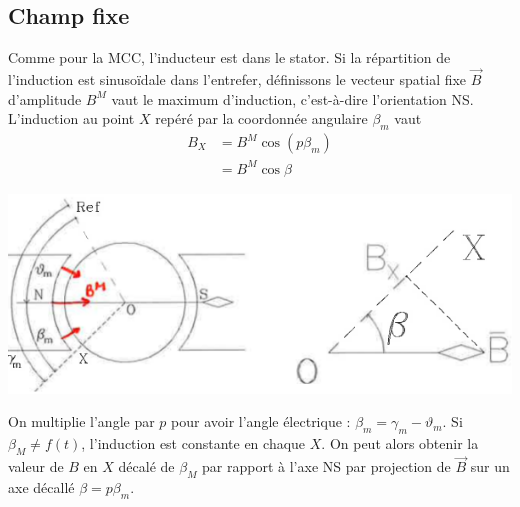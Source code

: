 	\subsection{Champ fixe}
	Comme pour la MCC, l'inducteur est dans le stator. Si la répartition de 
	l'induction est sinusoïdale dans l'entrefer, définissons le vecteur 
	spatial fixe $\vec{B}$ d'amplitude $B^M$ vaut le maximum d'induction, 
	c'est-à-dire l'orientation NS. L'induction au point $X$ repéré par la 
	coordonnée angulaire $\beta_m$ vaut
	\begin{equation}
	\begin{array}{ll}
	B_X &= B^M\cos(p\beta_m)\\
	&= B^M\cos\beta
	\end{array}
	\end{equation}
	\begin{center}
	\includegraphics[scale=0.34]{ch5/image2.png}
	\end{center}
	On multiplie l'angle par $p$ pour avoir l'angle électrique : $\beta_m = 
	\gamma_m-\vartheta_m$. Si $\beta_M \neq f(t)$, l'induction est constante 
	en chaque $X$. On peut alors obtenir la valeur de $B$ en $X$ décalé de 
	$\beta_M$ par rapport à l'axe NS par projection de $\vec{B}$ sur un axe 
	décallé $\beta = p\beta_m$.
	\newpage
	
